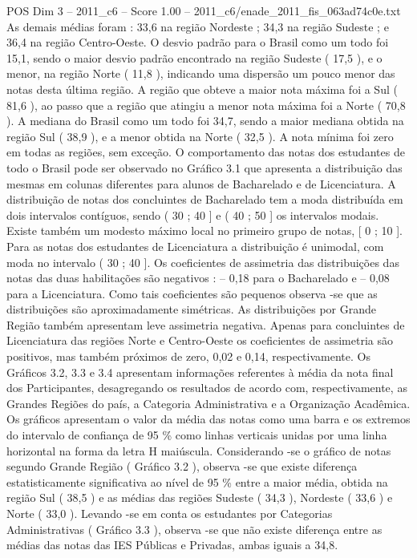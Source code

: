 \begin{textsample}{POS Dim 3 – 2011\_c6 – Score 1.00 – 2011\_c6/enade\_2011\_fis\_063ad74c0e.txt}
As demais médias foram : 33,6 na região Nordeste ; 34,3 na região Sudeste ; e 36,4 na região Centro-Oeste.
O desvio padrão para o Brasil como um todo foi 15,1, sendo o maior desvio padrão encontrado na região Sudeste ( 17,5 ), e o menor, na região Norte ( 11,8 ), indicando uma dispersão um pouco menor das notas desta última região.
A região que obteve a maior nota máxima foi a Sul ( 81,6 ), ao passo que a região que atingiu a menor nota máxima foi a Norte ( 70,8 ).
A mediana do Brasil como um todo foi 34,7, sendo a maior mediana obtida na região Sul ( 38,9 ), e a menor obtida na Norte ( 32,5 ).
A nota mínima foi zero em todas as regiões, sem exceção.
O comportamento das notas dos estudantes de todo o Brasil pode ser observado no Gráfico 3.1 que apresenta a distribuição das mesmas em colunas diferentes para alunos de Bacharelado e de Licenciatura.
A distribuição de notas dos concluintes de Bacharelado tem a moda distribuída em dois intervalos contíguos, sendo ( 30 ; 40 ] e ( 40 ; 50 ] os intervalos modais.
Existe também um modesto máximo local no primeiro grupo de notas, [ 0 ; 10 ].
Para as notas dos estudantes de Licenciatura a distribuição é unimodal, com moda no intervalo ( 30 ; 40 ].
Os coeficientes de assimetria das distribuições das notas das duas habilitações são negativos : – 0,18 para o Bacharelado e – 0,08 para a Licenciatura.
Como tais coeficientes são pequenos observa -se que as distribuições são aproximadamente simétricas.
As distribuições por Grande Região também apresentam leve assimetria negativa.
Apenas para concluintes de Licenciatura das regiões Norte e Centro-Oeste os coeficientes de assimetria são positivos, mas também próximos de zero, 0,02 e 0,14, respectivamente.
Os Gráficos 3.2, 3.3 e 3.4 apresentam informações referentes à média da nota final dos Participantes, desagregando os resultados de acordo com, respectivamente, as Grandes Regiões do país, a Categoria Administrativa e a Organização Acadêmica.
Os gráficos apresentam o valor da média das notas como uma barra e os extremos do intervalo de confiança de 95 \% como linhas verticais unidas por uma linha horizontal na forma da letra H maiúscula.
Considerando -se o gráfico de notas segundo Grande Região ( Gráfico 3.2 ), observa -se que existe diferença estatisticamente significativa ao nível de 95 \% entre a maior média, obtida na região Sul ( 38,5 ) e as médias das regiões Sudeste ( 34,3 ), Nordeste ( 33,6 ) e Norte ( 33,0 ).
Levando -se em conta os estudantes por Categorias Administrativas ( Gráfico 3.3 ), observa -se que não existe diferença entre as médias das notas das IES Públicas e Privadas, ambas iguais a 34,8.

\end{textsample}

